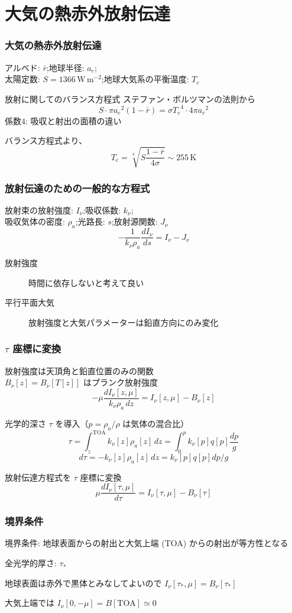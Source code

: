 \documentclass[unicode,colorlinks]{beamer}
\newcommand{\Unit}[1]{\,\mathrm{#1}}
\begin{document}
\section{大気の熱赤外放射伝達}

\begin{frame}
	\frametitle{大気の熱赤外放射伝達}
	アルベド: $\bar r$;\quad 地球半径: $a_e$;\quad\\
	太陽定数: $S=1366\Unit{W\,m^{-2}}$;\quad 地球大気系の平衡温度: $T_e$
	\begin{block}{放射に関してのバランス方程式}
		ステファン・ボルツマンの法則から
		\[S\cdot\pi{a_e}^2(1-\bar r)=\sigma{T_e}^4\cdot4\pi{a_e}^2\]
		係数$4$: 吸収と射出の面積の違い

		バランス方程式より、
		\[T_e=\sqrt[4]{S\frac{1-\bar r}{4\sigma}}\sim255\Unit{K}\]
	\end{block}
\end{frame}

\begin{frame}
	\frametitle{放射伝達のための一般的な方程式}
	放射束の放射強度: $I_\nu$;\quad 吸収係数: $k_\nu$;\\
	吸収気体の密度: $\rho_a$;\quad 光路長: $s$;\quad 放射源関数: $J_\nu$
	\[-\frac{1}{k_\nu \rho_a}\frac{dI_\nu}{ds}=I_\nu-J_\nu\]

	\begin{description}
		\item[放射強度] 時間に依存しないと考えて良い
		\item[平行平面大気] 放射強度と大気パラメーターは鉛直方向にのみ変化
	\end{description}
\end{frame}

\begin{frame}
	\frametitle{$\tau$ 座標に変換}
	放射強度は天頂角と鉛直位置のみの関数\\
	$B_\nu[z]=B_\nu[T[z]]$ はプランク放射強度
	\[-\mu\frac{dI_\nu[z,\mu]}{k_\nu\rho_a\,dz}=I_\nu[z,\mu]-B_\nu[z]\]

	光学的深さ $\tau$ を導入（$p=\rho_a/\rho$ は気体の混合比）
	\[\tau=\int^{\mathrm{TOA}}_{z} k_\nu[z]\rho_a[z]\,dz=\int^p_0 k_\nu[p]q[p]\frac{dp}{g}\]
	\[d\tau=-k_\nu[z]\rho_a[z]\,dz=k_\nu[p]q[p]dp/g\]

	放射伝達方程式を $\tau$ 座標に変換
	\[\mu\frac{dI_\nu[\tau,\mu]}{d\tau}=I_\nu[\tau,\mu]-B_\nu[\tau]\]
\end{frame}

\begin{frame}
	\frametitle{境界条件}
	境界条件: 地球表面からの射出と大気上端 (TOA) からの射出が等方性となる

	全光学的厚さ: $\tau_*$

	地球表面は赤外で黒体とみなしてよいので $I_\nu[\tau_*,\mu]=B_\nu[\tau_*]$

	大気上端では $I_\nu[0,-\mu]=B[\mathrm{TOA}]\simeq0$
\end{frame}
\end{document}
